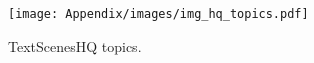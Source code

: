 \begin{figure}
    \centering
    \texttt{[image: Appendix/images/img\_hq\_topics.pdf]}
    \caption{TextScenesHQ topics.}
    \label{fig:hq_topics}
\end{figure}